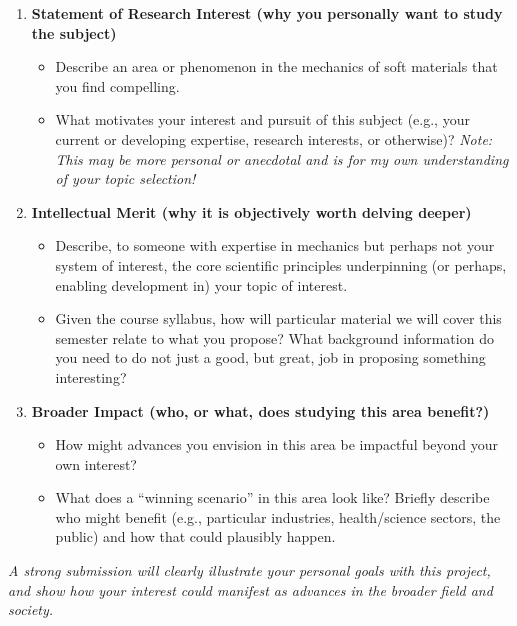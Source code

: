 \begin{enumerate}
\item \textbf{Statement of Research Interest (why you personally want to study the subject)}
\begin{itemize}
\item Describe an area or phenomenon in the mechanics of soft materials that you find compelling. 
\item What motivates your interest and pursuit of this subject (e.g., your current or developing expertise, research interests, or otherwise)? \textit{Note: This may be more personal or anecdotal and is for my own understanding of your topic selection!}
\end{itemize}
\item \textbf{Intellectual Merit (why it is objectively worth delving deeper)}
\begin{itemize}
\item Describe, to someone with expertise in mechanics but perhaps not your system of interest, the core scientific principles underpinning (or perhaps, enabling development in) your topic of interest. 
\item Given the course syllabus, how will particular material we will cover this semester relate to what you propose? What background information do you need to do not just a good, but great, job in proposing something interesting? 
\end{itemize}
\item \textbf{Broader Impact (who, or what, does studying this area benefit?)}
\begin{itemize}
\item How might advances you envision in this area be impactful beyond your own interest? 
\item What does a ``winning scenario'' in this area look like? Briefly describe who might benefit (e.g., particular industries, health/science sectors, the public) and how that could plausibly happen.
\end{itemize}
\end{enumerate}

\emph{A strong submission will clearly illustrate your personal goals with this project, and show how your interest could manifest as advances in the broader field and society.}

